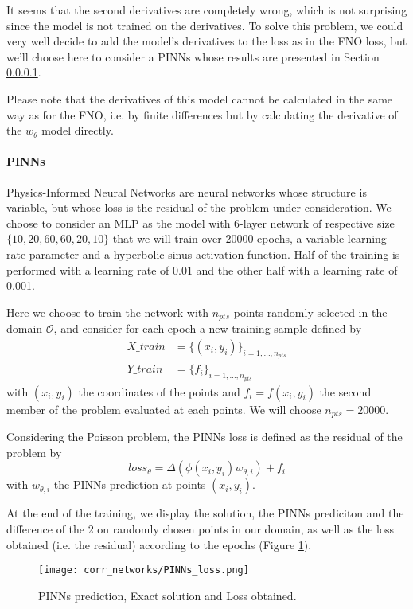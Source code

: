 It seems that the second derivatives are completely wrong, which is not surprising since the model is not trained on the derivatives. To solve this problem, we could very well decide to add the model's derivatives to the loss as in the FNO loss, but we'll choose here to consider a PINNs whose results are presented in Section \ref{Corr.results.neural_net.PINNs}.

\begin{Rem}
	Please note that the derivatives of this model cannot be calculated in the same way as for the FNO, i.e. by finite differences but by calculating the derivative of the $w_\theta$ model directly.
\end{Rem}

\paragraph{PINNs} \label{Corr.results.neural_net.PINNs}

Physics-Informed Neural Networks are neural networks whose structure is variable, but whose loss is the residual of the problem under consideration. We choose to consider an MLP as the model with 6-layer network of respective size $\{10,20,60,60,20,10\}$ that we will train over 20000 epochs, a variable learning rate parameter and a hyperbolic sinus activation function. Half of the training is performed with a learning rate of 0.01 and the other half with a learning rate of 0.001.

Here we choose to train the network with $n_{pts}$ points randomly selected in the domain $\mathcal{O}$, and consider for each epoch a new training sample defined by
\begin{align*}
	X\_train&=\{(x_i,y_i)\}_{i=1,\dots,n_{pts}} \\
	Y\_train&=\{f_i\}_{i=1,\dots,n_{pts}} 
\end{align*}
with $(x_i,y_i)$ the coordinates of the points and $f_i=f(x_i,y_i)$ the second member of the problem evaluated at each points. We will choose $n_{pts}=20000$.

Considering the Poisson problem, the PINNs loss is defined as the residual of the problem by
\begin{equation*}
	loss_\theta = \Delta(\phi(x_i,y_i)w_{\theta,i})+f_i
\end{equation*}
with $w_{\theta,i}$ the PINNs prediction at points $(x_i,y_i)$.

At the end of the training, we display the solution, the PINNs prediciton and the difference of the 2 on randomly chosen points in our domain, as well as the loss obtained (i.e. the residual) according to the epochs (Figure \ref{corr_networks_PINNs_loss}).
\begin{figure}[H]
	\centering
	\texttt{[image: corr\_networks/PINNs\_loss.png]}
	\caption{PINNs prediction, Exact solution and Loss obtained.}
	\label{corr_networks_PINNs_loss}
\end{figure} 

